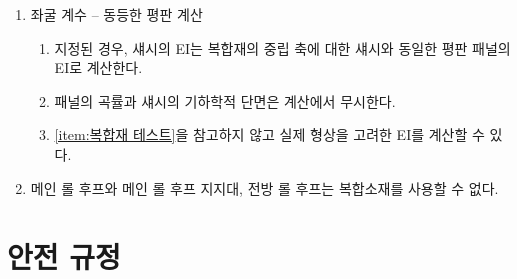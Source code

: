 \documentclass[final,a4paper,10pt]{report}
\begin{document}
\begin{enumerate}
\begin{enumerate}
\begin{enumerate}
          \item\label{rule:formula-technical.alternative-materials.testing.lap-joint-test.test-data-and-photos} 시험 설정의 힘 및 변위 데이터와 사진이 구조 대응물 양식의 첨부서류에 포함되어야 한다.
          \item\label{rule:formula-technical.alternative-materials.testing.lap-joint-test.shear-exceeds-facesheet-tensile} 접착부분의 전단 강도는 외피(섬유적층부분, 스킨)부분의 인장강도보다 커야 한다.
        \end{enumerate}
    \end{enumerate}

  \item\label{rule:formula-technical.alternative-materials.equivalent-plate-calculation} 좌굴 계수 – 동등한 평판 계산
    \begin{enumerate}
      \item\label{rule:formula-technical.alternative-materials.equivalent-plate-calculation.ei-as-flat-plate} 지정된 경우, 섀시의 EI는 복합재의 중립 축에 대한 섀시와 동일한 평판 패널의 EI로 계산한다.
      \item\label{rule:formula-technical.alternative-materials.equivalent-plate-calculation.curvature-and-geometry-ignored} 패널의 곡률과 섀시의 기하학적 단면은 계산에서 무시한다.
      \item\label{rule:formula-technical.alternative-materials.equivalent-plate-calculation.actual-geometry-ei-option} \ref{item:복합재 테스트}을 참고하지 않고 실제 형상을 고려한 EI를 계산할 수 있다.
    \end{enumerate}

  \item\label{rule:formula-technical.alternative-materials.no-composite-for-hoops} 메인 롤 후프와 메인 롤 후프 지지대, 전방 롤 후프는 복합소재를 사용할 수 없다.
\end{enumerate}

\chapter{안전 규정}
\end{document}
